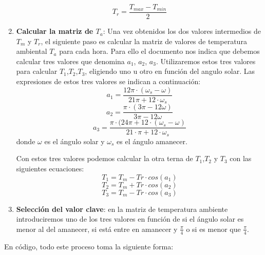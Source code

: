 \begin{enumerate}
\begin{equation}
T_r = \frac{T_{max} - T_{min} }{2}
\end{equation}

\item \textbf{Calcular la matriz de $T_a$}: Una vez obtenidos los dos valores intermedios de $T_m$ y $T_r$, el siguiente paso es calcular la matriz de valores de temperatura ambiental $T_a$ para cada hora. Para ello el documento nos indica que debemos calcular tres valores que denomina $a_1$, $a_2$, $a_3$. Utilizaremos estos tres valores para calcular $T_1$,$T_2$,$T_3$, eligiendo uno u otro en función del angulo solar. Las expresiones de estos tres valores se indican a continuación:
\begin{equation}
a_1 = \frac{12\pi \cdot (\omega_s - \omega)}{21 \pi + 12 \cdot \omega_s}
\end{equation}
\begin{equation}
a_2 = \frac{\pi \cdot (3\pi - 12\omega)}{3\pi - 12\omega}
\end{equation}
\begin{equation}
a_3 = \frac{\pi \cdot (24\pi +  12 \cdot (\omega_s - \omega) }{21 \cdot \pi + 12 \cdot \omega_s}
\end{equation}
donde $\omega$ es el ángulo solar y $\omega_s$ es el ángulo amanecer.

Con estos tres valores podemos calcular la otra terna de $T_1$,$T_2$ y $T_3$ con las siguientes ecuaciones:
\begin{equation}
T_1 = T_m - Tr \cdot cos(a_1)
\end{equation}
\begin{equation}
T_2 = T_m + Tr \cdot cos(a_2)
\end{equation}
\begin{equation}
T_3 = T_m - Tr \cdot cos(a_3)
\end{equation}

\item \textbf{Selección del valor clave}: en la matriz de temperatura ambiente introduciremos uno de los tres valores en función de si el ángulo solar es menor al del amanecer, si está entre en amanecer y $\frac{\pi}{4}$ o si es menor que $\frac{\pi}{4}$.

\end{enumerate}
\newpage
En código, todo este proceso toma la siguiente forma:

